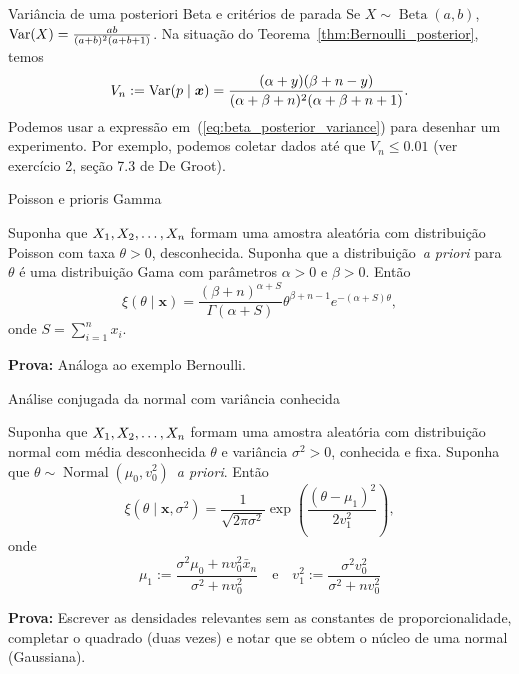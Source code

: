 \begin{frame}{Variância de uma posteriori Beta e critérios de parada}
 Se $X \sim \operatorname{Beta}(a, b)$, $\operatorname{Var}(X) = \frac{ab}{(a+b)^2(a + b+ 1)}$.
 Na situação do Teorema~\ref{thm:Bernoulli_posterior}, temos
 \begin{equation}
  \label{eq:beta_posterior_variance}
 V_n := \operatorname{Var}(p \mid \boldsymbol{x}) = \frac{(\alpha + y)(\beta + n - y)}{(\alpha + \beta + n)^2(\alpha + \beta + n + 1)}.  
 \end{equation}
 Podemos usar a expressão em~(\ref{eq:beta_posterior_variance}) para desenhar um experimento.
 Por exemplo, podemos coletar dados até que $V_n \leq 0.01$ (ver exercício 2, seção 7.3 de De Groot). 
\end{frame}

\begin{frame}{Poisson e prioris Gamma}
 \begin{theo}
  Suponha que $X_1, X_2, \ldots, X_n$ formam uma amostra aleatória com distribuição Poisson com taxa $\theta > 0$, desconhecida.
  Suponha que a distribuição~\textit{a priori} para $\theta$ é uma distribuição Gama com parâmetros $\alpha >0$ e $\beta > 0$.
  Então
  \begin{equation}
   \xi(\theta \mid \boldsymbol{x}) = \frac{ (\beta + n)^{\alpha + S} }{\Gamma(\alpha + S)} \theta^{\beta + n-1} e^{-(\alpha + S)\theta},
  \end{equation}
  onde $S = \sum_{i=1}^n x_i$.
 \end{theo}
\textbf{Prova:} Análoga ao exemplo Bernoulli.
\end{frame}

\begin{frame}{Análise conjugada da normal com variância conhecida}
 \begin{theo}
  Suponha que $X_1, X_2, \ldots, X_n$ formam uma amostra aleatória com distribuição normal com média desconhecida $\theta$ e variância $\sigma^2 >0$, conhecida e fixa.
  Suponha que $\theta \sim \operatorname{Normal}(\mu_0, v_0^2)$~\textit{a priori}.
  Então
  \begin{equation}
   \xi(\theta \mid \boldsymbol{x}, \sigma^2) =  \frac{1}{\sqrt{2\pi\sigma^2}} \exp\left( \frac{(\theta-\mu_1)^2}{2v_1^2} \right),
  \end{equation}
onde
\begin{equation}
\mu_1 := \frac{\sigma^2 \mu_0 + nv_0^2\bar{x}_n}{\sigma^2 + nv_0^2} \quad\text{e}\quad v_1^2 := \frac{\sigma^2v_0^2}{\sigma^2 + nv_0^2}
\end{equation}
\end{theo}
\textbf{Prova:} Escrever as densidades relevantes sem as constantes de proporcionalidade, completar o quadrado (duas vezes) e notar que se obtem o núcleo de uma normal (Gaussiana).
\end{frame}

